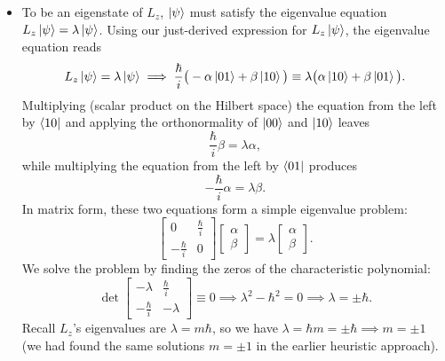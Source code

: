 \documentclass[11pt, a4paper]{article}
\begin{document}
\begin{itemize}
	\item To be an eigenstate of $ L_{z} $, $ \ket{\psi} $ must satisfy the eigenvalue equation $ L_{z}\ket{\psi} = \lambda \ket{\psi}  $. Using our just-derived expression for $ L_{z}\ket{\psi}  $, the eigenvalue equation reads
	\begin{equation*}
		L_{z}\ket{\psi} = \lambda \ket{\psi} \implies \frac{\hbar}{i}\big(-\alpha \ket{01} + \beta \ket{10}\big) \equiv \lambda \big(\alpha \ket{10} + \beta \ket{01}\big).
	\end{equation*}
	Multiplying (scalar product on the Hilbert space) the equation from the left by $ \bra{10} $ and applying the orthonormality of $ \ket{00} $ and $ \ket{10} $ leaves
	\begin{equation*}
		\frac{\hbar}{i}\beta = \lambda \alpha,
	\end{equation*}
	while multiplying the equation from the left by $ \bra{01} $ produces
	\begin{equation*}
		-\frac{\hbar}{i}\alpha = \lambda \beta.
	\end{equation*}
	In matrix form, these two equations form a simple eigenvalue problem:
	\begin{equation*}
		\begin{bmatrix}
			0 & \frac{\hbar}{i}\\
			-\frac{\hbar}{i} & 0
		\end{bmatrix}
		\begin{bmatrix}
			\alpha\\
			\beta
		\end{bmatrix}
		= \lambda
		\begin{bmatrix}
			\alpha\\
			\beta
		\end{bmatrix}.
	\end{equation*}
	We solve the problem by finding the zeros of the characteristic polynomial:
	\begin{equation*}
		\det 
		\begin{bmatrix}
			-\lambda & \frac{\hbar}{i}\\
			-\frac{\hbar}{i} & -\lambda
		\end{bmatrix} \equiv 0 \implies \lambda^{2} - \hbar^{2} = 0 \implies \lambda = \pm \hbar.
	\end{equation*}
	Recall $ L_{z} $'s eigenvalues are $ \lambda = m \hbar $, so we have  $ \lambda = \hbar m = \pm \hbar \implies m = \pm 1$ (we had found the same solutions $ m = \pm 1 $ in the earlier heuristic approach). 
	

\end{itemize}
\end{document}
